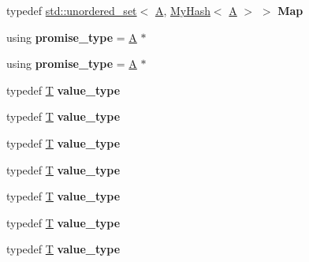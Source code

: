 \begin{DoxyCompactItemize}
\item 
\mbox{\label{struct_a_a7cbab70cf32d1707587643277aa77016}} 
typedef \mbox{\hyperlink{classstd_1_1unordered__set}{std\+::unordered\+\_\+set}}$<$ \mbox{\hyperlink{struct_a}{A}}, \mbox{\hyperlink{struct_my_hash}{My\+Hash}}$<$ \mbox{\hyperlink{struct_a}{A}} $>$ $>$ {\bfseries Map}
\item 
\mbox{\label{struct_a_a746b7eb858989a616cac6266ecfc4a36}} 
using {\bfseries promise\+\_\+type} = \mbox{\hyperlink{struct_a}{A}} $\ast$
\item 
\mbox{\label{struct_a_a746b7eb858989a616cac6266ecfc4a36}} 
using {\bfseries promise\+\_\+type} = \mbox{\hyperlink{struct_a}{A}} $\ast$
\item 
\mbox{\label{struct_a_ae136ecf80b1597fcfaa23e26cbcdbb6c}} 
typedef \mbox{\hyperlink{struct_t}{T}} {\bfseries value\+\_\+type}
\item 
\mbox{\label{struct_a_ae136ecf80b1597fcfaa23e26cbcdbb6c}} 
typedef \mbox{\hyperlink{struct_t}{T}} {\bfseries value\+\_\+type}
\item 
\mbox{\label{struct_a_ae136ecf80b1597fcfaa23e26cbcdbb6c}} 
typedef \mbox{\hyperlink{struct_t}{T}} {\bfseries value\+\_\+type}
\item 
\mbox{\label{struct_a_ae136ecf80b1597fcfaa23e26cbcdbb6c}} 
typedef \mbox{\hyperlink{struct_t}{T}} {\bfseries value\+\_\+type}
\item 
\mbox{\label{struct_a_ae136ecf80b1597fcfaa23e26cbcdbb6c}} 
typedef \mbox{\hyperlink{struct_t}{T}} {\bfseries value\+\_\+type}
\item 
\mbox{\label{struct_a_ae136ecf80b1597fcfaa23e26cbcdbb6c}} 
typedef \mbox{\hyperlink{struct_t}{T}} {\bfseries value\+\_\+type}
\item 
\mbox{\label{struct_a_ae136ecf80b1597fcfaa23e26cbcdbb6c}} 
typedef \mbox{\hyperlink{struct_t}{T}} {\bfseries value\+\_\+type}
\item 
\mbox{\label{struct_a_ae136ecf80b1597fcfaa23e26cbcdbb6c}} 

\end{DoxyCompactItemize}

